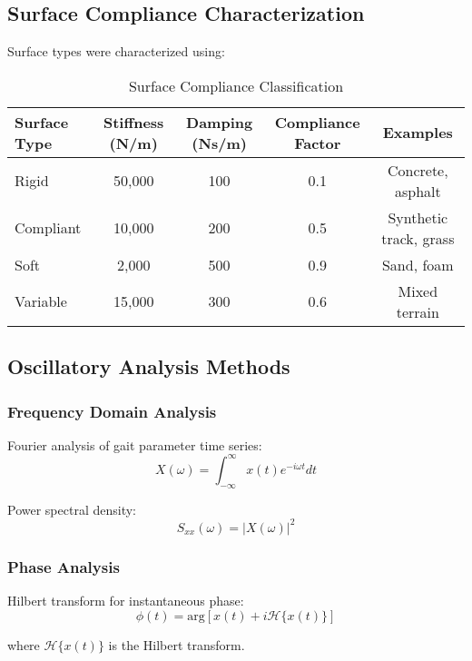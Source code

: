 \documentclass[12pt]{article}
\begin{document}
\subsection{Surface Compliance Characterization}

Surface types were characterized using:

\begin{table}[h]
\centering
\caption{Surface Compliance Classification}
\begin{tabular}{lcccc}
\toprule
Surface Type & Stiffness (N/m) & Damping (Ns/m) & Compliance Factor & Examples \\
\midrule
Rigid & 50,000 & 100 & 0.1 & Concrete, asphalt \\
Compliant & 10,000 & 200 & 0.5 & Synthetic track, grass \\
Soft & 2,000 & 500 & 0.9 & Sand, foam \\
Variable & 15,000 & 300 & 0.6 & Mixed terrain \\
\bottomrule
\end{tabular}
\end{table}

\subsection{Oscillatory Analysis Methods}

\subsubsection{Frequency Domain Analysis}
Fourier analysis of gait parameter time series:
\begin{equation}
X(\omega) = \int_{-\infty}^{\infty} x(t) e^{-i\omega t} dt
\end{equation}

Power spectral density:
\begin{equation}
S_{xx}(\omega) = |X(\omega)|^2
\end{equation}

\subsubsection{Phase Analysis}
Hilbert transform for instantaneous phase:
\begin{equation}
\phi(t) = \text{arg}[x(t) + i \mathcal{H}\{x(t)\}]
\end{equation}

where $\mathcal{H}\{x(t)\}$ is the Hilbert transform.
\end{document}
